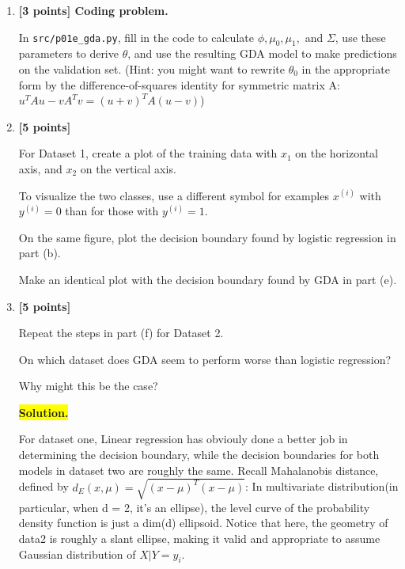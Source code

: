 \documentclass[10pt]{article}
\begin{document}
\begin{enumerate}
\begin{enumerate}[label=(\alph*)]
\hfill$\square$



\item \textbf{[3 points] Coding problem.}

In \texttt{src/p01e\_gda.py}, fill in the code to calculate
$\phi,\mu_0,\mu_1,$ and $\Sigma$, use these parameters to derive
$\theta$, and use the resulting GDA model to make predictions on the
validation set. (Hint: you might want to rewrite $\theta_0$ in the appropriate form
by the difference-of-squares identity for symmetric matrix A: $u^TAu - vA^Tv = (u+v)^TA(u-v)$)


\item \textbf{[5 points]}

For Dataset 1, create a plot of the training data with $x_1$ on the
horizontal axis, and $x_2$ on the vertical axis.

To visualize the two classes, use a different symbol for examples
$x^{(i)}$ with $y^{(i)}=0$ than for those with $y^{(i)}=1$.

On the same figure, plot the decision boundary found by logistic
regression in part (b).

Make an identical plot with the decision boundary found by GDA in
part (e).


\item \textbf{[5 points]}

Repeat the steps in part (f) for Dataset 2.

On which dataset does GDA seem to perform worse than logistic
regression?

Why might this be the case?

\medskip
\noindent\colorbox{yellow}{\textbf{Solution.}}

For dataset one, Linear regression has obviouly done a better job in determining the decision boundary, while 
the decision boundaries for both models in dataset two are roughly the same. Recall Mahalanobis distance, defined by 
$d_{E}(x,\mu) = \sqrt{(x-\mu)^T (x - \mu)}$: In multivariate distribution(in particular, when d = 2, it's an ellipse), the level curve of the probability density function is just a dim(d) ellipsoid.
Notice that here, the geometry of data2 is roughly a slant ellipse, making it valid and appropriate to assume Gaussian distribution of $X | Y = y_i $.


\end{enumerate}
\end{enumerate}
\end{document}
